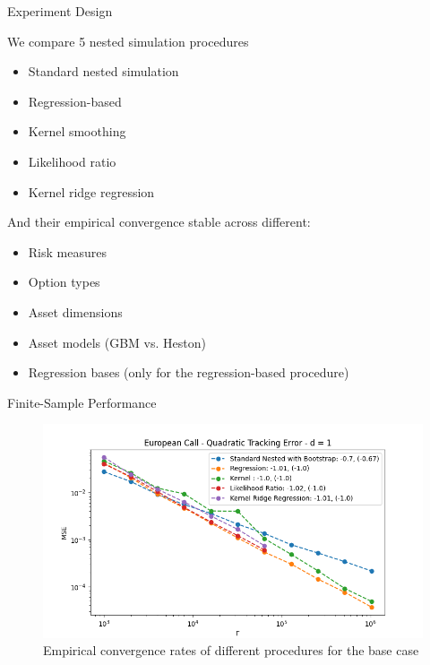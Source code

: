\documentclass[9pt,handout]{beamer}
\begin{document}
\begin{frame}{Experiment Design}

We compare 5 nested simulation procedures 
\begin{itemize}
    \item Standard nested simulation
    \item Regression-based
    \item Kernel smoothing
    \item Likelihood ratio
    \item Kernel ridge regression
\end{itemize}

And their empirical convergence stable across different:
\begin{itemize}
    \item Risk measures
    \item Option types
    \item Asset dimensions
    \item Asset models (GBM vs. Heston)
    \item Regression bases (only for the regression-based procedure)
\end{itemize}

\end{frame}

\begin{frame}{Finite-Sample Performance}

\begin{figure}
    \includegraphics[width=\textwidth]{../project1/figures/figure1.png}
    \caption{Empirical convergence rates of different procedures for the base case}
\end{figure}

\end{frame}
\end{document}
